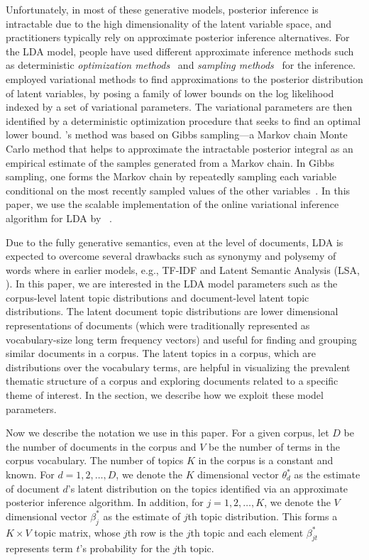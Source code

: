 Unfortunately, in most of these generative models, posterior 
inference is intractable due to the high dimensionality of the 
latent variable space, and practitioners typically rely on 
approximate posterior inference alternatives. For the LDA model, 
people have used different approximate inference methods such as 
deterministic \textsl{optimization methods}~\cite{Blei2003} and 
\textsl{sampling methods}~\cite{Griffiths2004} for the inference. 
\citeauthor{Blei2003} employed variational methods to find 
approximations to the posterior distribution of latent variables, by 
posing a family of lower bounds on the log likelihood indexed 
by a set of variational parameters. The variational parameters are 
then identified by a deterministic optimization procedure that seeks 
to find an optimal lower bound. \citeauthor{Griffiths2004}'s method 
was based on Gibbs sampling---a Markov chain Monte Carlo 
method that helps to approximate the intractable posterior integral 
as an empirical estimate of the samples generated from a Markov chain.   
In Gibbs sampling, one forms the Markov chain by repeatedly sampling 
each variable conditional on the most recently sampled values of the 
other variables~\cite{Geman1984}. In this paper, we use the scalable 
implementation of the online variational inference algorithm for LDA
\cite{hoffman2010online} by~\citeauthor{rehurek_lrec} 
\citeyear{rehurek_lrec}. 


Due to the fully generative semantics, even at the level of 
documents, LDA is expected to overcome several drawbacks such as 
synonymy and polysemy of words where in earlier models, e.g., TF-IDF
\cite{Salton1975} and Latent Semantic Analysis (LSA, \citeauthor{Dumais1995} 
\citeyear{Dumais1995}). In this paper, we are interested in the LDA 
model parameters such as the corpus-level latent topic distributions 
and document-level latent topic distributions. The latent document 
topic distributions are lower dimensional representations of 
documents (which were traditionally represented as vocabulary-size 
long term frequency vectors) 
and useful for finding and grouping similar documents in a corpus. 
The latent topics in a corpus, which are distributions over the 
vocabulary terms, are helpful in visualizing the prevalent thematic 
structure of a corpus and exploring documents related to a specific 
theme of interest. In the \system section, we describe how we 
exploit these model parameters.   

Now we describe the notation we use in this paper. For a given corpus, 
let $D$ be the number of documents in the corpus and $V$ be the 
number of terms in the corpus vocabulary. The number of topics $K$ 
in the corpus is a constant and known. For $d = 1, 2, \ldots, D$, we 
denote the $K$ dimensional vector $\theta_d^{*}$ as the estimate of 
document $d$'s latent distribution on the topics identified via an 
approximate posterior inference algorithm. In addition, for $j = 1, 
2, \ldots, K$, we denote the $V$ dimensional vector $\beta_j^{*}$ as 
the estimate of $j$th topic distribution. This forms a $K \times V$ 
topic matrix, whose $j$th row is the $j$th topic and each element 
$\beta_{jt}^{*}$ represents term $t$'s probability for the 
$j$th topic.   





